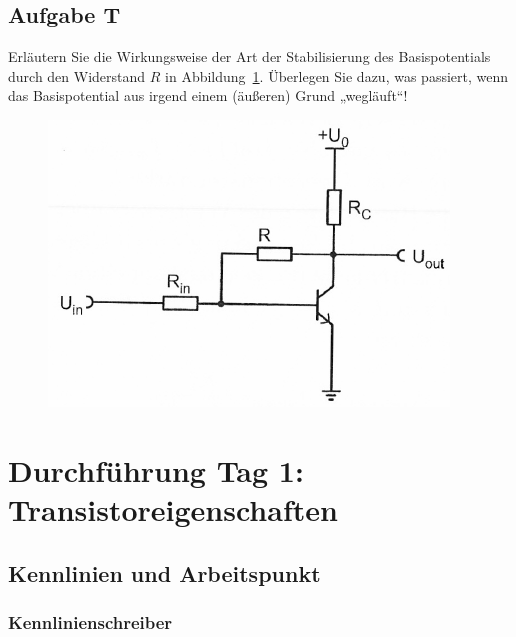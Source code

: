 \fehlt

\FloatBarrier
\subsection{Aufgabe T}

\begin{problem}
	Erläutern Sie die Wirkungsweise der Art der Stabilisierung des
	Basispotentials durch den Widerstand $R$ in Abbildung~\ref{fig:3_4-16}.
	Überlegen Sie dazu, was passiert, wenn das Basispotential aus irgend einem
	(äußeren) Grund „wegläuft“!
\end{problem}

\begin{figure}[htbp]
	\centering
	\includegraphics[width=.6\textwidth]{Anleitung/3_4-16.png}
	\caption{%
		\cite[Abbildung~3/4.16]{physik313-Anleitung}
	}
	\label{fig:3_4-16}
\end{figure}

\fehlt


\FloatBarrier
\section{Durchführung Tag 1: Transistoreigenschaften}

\FloatBarrier
\subsection{Kennlinien und Arbeitspunkt}

\subsubsection{Kennlinienschreiber}

